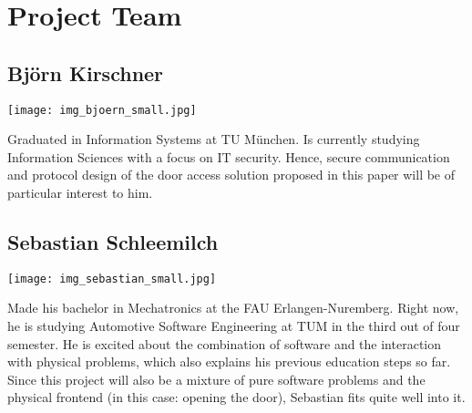 \section{Project Team}\label{sec:team}

\subsection{Björn Kirschner}
%
\begin{minipage}{0.2\textwidth}
\begin{flushleft}
	\texttt{[image: img\_bjoern\_small.jpg]}
\end{flushleft}
\end{minipage}
\hfill
\begin{minipage}{0.8\textwidth}
%
Graduated in Information Systems at TU München. Is currently studying Information Sciences with a focus on IT security. Hence, secure communication and protocol design of the door access solution proposed in this paper will be of particular interest to him.
%
\end{minipage}


\subsection{Sebastian Schleemilch}
%
\begin{minipage}{0.2\textwidth}
\begin{flushleft}
	\texttt{[image: img\_sebastian\_small.jpg]}
\end{flushleft}
\end{minipage}
\hfill
\begin{minipage}{0.8\textwidth}
%
Made his bachelor in Mechatronics at the FAU Erlangen-Nuremberg. Right now, he is studying Automotive Software Engineering at TUM in the third out of four semester. He is excited about the combination of software and the interaction with physical problems, which also explains his previous education steps so far.
Since this project will also be a mixture of pure software problems and the physical frontend (in this case: opening the door), Sebastian fits quite well into it.
%
\end{minipage}


